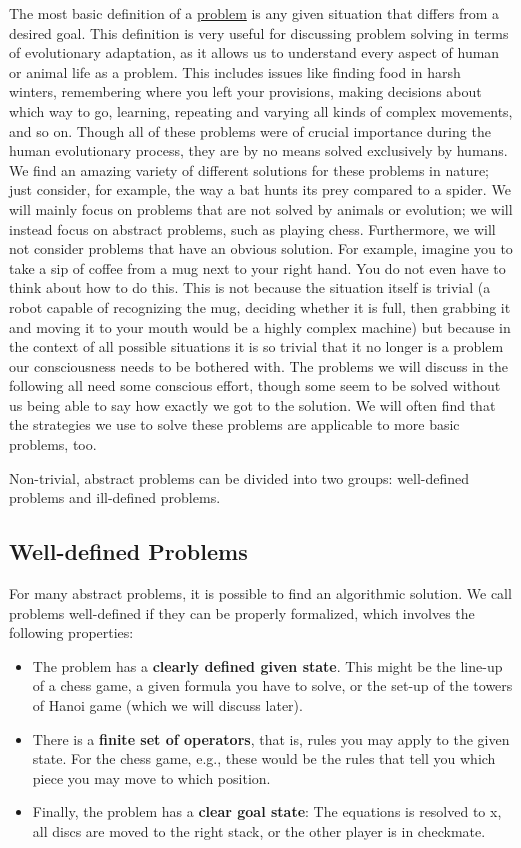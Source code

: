 \documentclass[
]{krantz}
\begin{document}
The most basic definition of a \hyperref[problem]{problem} is any given situation that differs from a desired goal. This definition is very useful for discussing problem solving in terms of evolutionary adaptation, as it allows us to understand every aspect of human or animal life as a problem. This includes issues like finding food in harsh winters, remembering where you left your provisions, making decisions about which way to go, learning, repeating and varying all kinds of complex movements, and so on. Though all of these problems were of crucial importance during the human evolutionary process, they are by no means solved exclusively by humans. We find an amazing variety of different solutions for these problems in nature; just consider, for example, the way a bat hunts its prey compared to a spider. We will mainly focus on problems that are not solved by animals or evolution; we will instead focus on abstract problems, such as playing chess. Furthermore, we will not consider problems that have an obvious solution. For example, imagine you to take a sip of coffee from a mug next to your right hand. You do not even have to think about how to do this. This is not because the situation itself is trivial (a robot capable of recognizing the mug, deciding whether it is full, then grabbing it and moving it to your mouth would be a highly complex machine) but because in the context of all possible situations it is so trivial that it no longer is a problem our consciousness needs to be bothered with. The problems we will discuss in the following all need some conscious effort, though some seem to be solved without us being able to say how exactly we got to the solution. We will often find that the strategies we use to solve these problems are applicable to more basic problems, too.

Non-trivial, abstract problems can be divided into two groups: well-defined problems and ill-defined problems.

\subsection*{Well-defined Problems}\label{well-defined-problems}


For many abstract problems, it is possible to find an algorithmic solution. We call problems well-defined if they can be properly formalized, which involves the following properties:

\begin{itemize}
\item
  The problem has a \textbf{clearly defined given state}. This might be the line-up of a chess game, a given formula you have to solve, or the set-up of the towers of Hanoi game (which we will discuss later).
\item
  There is a \textbf{finite set of operators}, that is, rules you may apply to the given state. For the chess game, e.g., these would be the rules that tell you which piece you may move to which position.
\item
  Finally, the problem has a \textbf{clear goal state}: The equations is resolved to x, all discs are moved to the right stack, or the other player is in checkmate.
\end{itemize}
\end{document}
